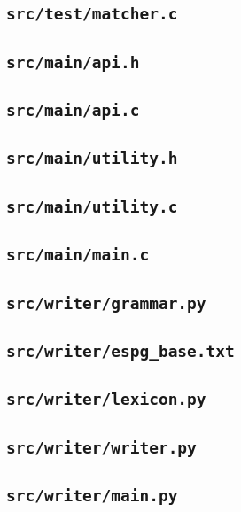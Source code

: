 \documentclass[../main.tex]{subfiles}
\begin{document}
\subsection{\texttt{src/test/matcher.c}}


\subsection{\texttt{src/main/api.h}}


\subsection{\texttt{src/main/api.c}}


\subsection{\texttt{src/main/utility.h}}


\subsection{\texttt{src/main/utility.c}}


\subsection{\texttt{src/main/main.c}}


\subsection{\texttt{src/writer/grammar.py}}


\subsection{\texttt{src/writer/espg\_base.txt}}


\subsection{\texttt{src/writer/lexicon.py}}


\subsection{\texttt{src/writer/writer.py}}


\subsection{\texttt{src/writer/main.py}}

\end{document}
